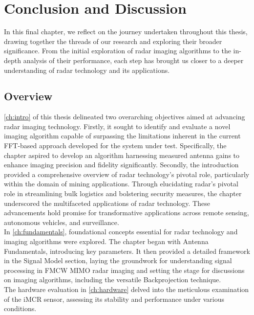 \chapter{Conclusion and Discussion}

In this final chapter, we reflect on the journey undertaken throughout this thesis,
drawing together the threads of our research and exploring their broader significance.
From the initial exploration of radar imaging algorithms to the in-depth analysis of their performance,
each step has brought us closer to a deeper understanding of radar technology and its applications.

\section{Overview}
\autoref{ch:intro} of this thesis delineated two overarching objectives
aimed at advancing radar imaging technology. Firstly, it sought to identify 
and evaluate a novel imaging algorithm capable of surpassing the limitations inherent
in the current FFT-based approach developed for the system under test. Specifically, 
the chapter aspired to develop an algorithm harnessing measured antenna gains to 
enhance imaging precision and fidelity significantly. 
Secondly, the introduction provided a comprehensive overview of radar technology's pivotal role,
particularly within the domain of mining applications. Through elucidating radar's pivotal role 
in streamlining bulk logistics and bolstering security measures,
the chapter underscored the multifaceted applications of radar technology.
These advancements hold promise for transformative applications across remote sensing,
autonomous vehicles, and surveillance.
\\
In \autoref{ch:fundamentals}, foundational concepts essential for 
radar technology and imaging algorithms were explored. 
The chapter began with Antenna Fundamentals, introducing key parameters.
It then provided a detailed framework in the Signal Model section,
laying the groundwork for understanding signal processing in FMCW MIMO radar imaging 
and setting the stage for discussions on imaging algorithms, including the versatile Backprojection technique.
\\
The hardware evaluation in \autoref{ch:hardware} delved into the meticulous examination
of the iMCR sensor, assessing its stability and performance under various conditions.
